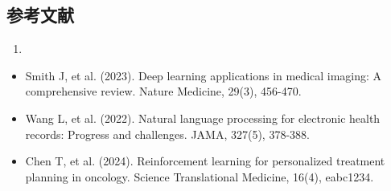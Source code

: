 \subsection{参考文献}
\begin{enumerate}
\item 
\end{enumerate}
\begin{itemize}
\item Smith J, et al. (2023). Deep learning applications in medical imaging: A comprehensive review. Nature Medicine, 29(3), 456-470.
\end{itemize}
\begin{itemize}
\item Wang L, et al. (2022). Natural language processing for electronic health records: Progress and challenges. JAMA, 327(5), 378-388.
\end{itemize}
\begin{itemize}
\item Chen T, et al. (2024). Reinforcement learning for personalized treatment planning in oncology. Science Translational Medicine, 16(4), eabc1234.
\end{itemize}

